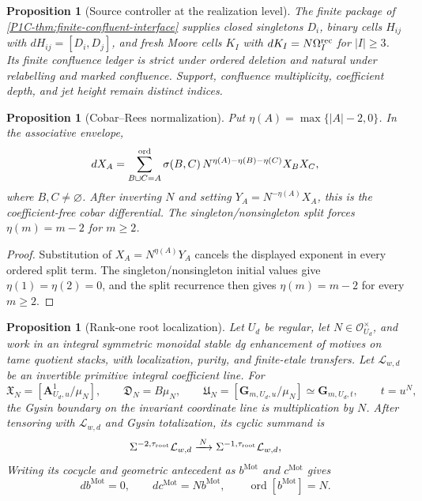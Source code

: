 \documentclass[11pt]{article}
\newtheorem{proposition}[theorem]{Proposition}
\theoremstyle{remark}
\newcommand{\Mot}{\mathrm{Mot}}
\begin{document}
\begin{proposition}[Source controller at the realization level]
\label{P2M-thm:imported-fsccomp-interface}
\label{P2M-thm:v33-imported-confluent-jet-interface}
The finite package of \cref{P1C-thm:finite-confluent-interface} supplies closed
singletons \(D_i\), binary cells \(H_{ij}\) with
\(dH_{ij}=[D_i,D_j]\), and fresh Moore cells \(K_I\) with
\(dK_I=N\Omega_I^{\rm rec}\) for \(|I|\ge3\).  Its finite confluence ledger is
strict under ordered deletion and natural under relabelling and marked
confluence.  Support, confluence multiplicity, coefficient depth, and jet
height remain distinct indices.
\end{proposition}

\begin{proposition}[Cobar--Rees normalization]
\label{P2M-prop:cobar-rees-normal-form}
\label{P2M-prop:eta-unique-primitive}
Put \(\eta(A)=\max\{|A|-2,0\}\).  In the associative envelope,
\[
 dX_A=
 \sum_{B\sqcup C=A}^{\rm ord}
 \sigma(B,C)\,
 N^{\eta(A)-\eta(B)-\eta(C)}X_BX_C,
\]
where \(B,C\ne\varnothing\).  After inverting \(N\) and setting
\(Y_A=N^{-\eta(A)}X_A\), this is the coefficient-free cobar differential.
The singleton/nonsingleton split forces \(\eta(m)=m-2\) for \(m\ge2\).
\end{proposition}

\begin{proof}
Substitution of \(X_A=N^{\eta(A)}Y_A\) cancels the displayed exponent in
every ordered split term.  The singleton/nonsingleton initial values give
\(\eta(1)=\eta(2)=0\), and the split recurrence then gives
\(\eta(m)=m-2\) for every \(m\ge2\).
\end{proof}

\begin{proposition}[Rank-one root localization]
\label{P2M-prop:appendix-root-moore-complex}
Let \(U_d\) be regular, let \(N\in\mathcal O_{U_d}^{\times}\), and work in an
integral symmetric monoidal stable dg enhancement of motives on tame quotient
stacks, with localization, purity, and finite-etale transfers.  Let
\(\mathcal L_{w,d}\) be an invertible primitive integral coefficient line.
For
\[
 \mathfrak X_N=[\mathbf A^1_{U_d,u}/\mu_N],\qquad
 \mathfrak D_N=B\mu_N,\qquad
 \mathfrak U_N=[\mathbf G_{m,U_d,u}/\mu_N]\simeq\mathbf G_{m,U_d,t},
 \qquad t=u^N,
\]
the Gysin boundary on the invariant coordinate line is multiplication by
\(N\).  After tensoring with \(\mathcal L_{w,d}\) and Gysin totalization, its
cyclic summand is
\[
 \Sigma^{-2,\tau_{\rm root}}\mathcal L_{w,d}
 \xrightarrow{\,N\,}
 \Sigma^{-1,\tau_{\rm root}}\mathcal L_{w,d},
\]
Writing its cocycle and geometric antecedent as \(b^{\Mot}\) and \(c^{\Mot}\)
gives
\[
 db^{\Mot}=0,\qquad dc^{\Mot}=Nb^{\Mot},\qquad
 \operatorname{ord}[b^{\Mot}]=N.
\]
\end{proposition}
\end{document}

